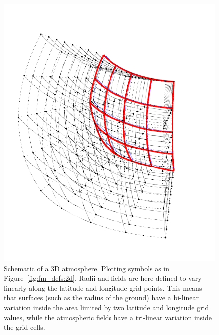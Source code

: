 \begin{figure}[!p]
 \begin{center}
  \includegraphics*[angle=-90,width=0.98\hsize]{Figs/fm_definitions/atm_dim_3d}
  \vspace*{-15mm}
  \caption{Schematic of a 3D atmosphere. Plotting symbols as in 
    Figure~\ref{fig:fm_defs:2d}. Radii and fields are here defined to
    vary linearly along the latitude and longitude grid points. This
    means that surfaces (such as the radius of the ground) have a
    bi-linear variation inside the area limited by two latitude and
    longitude grid values, while the atmospheric fields have a
    tri-linear variation inside the grid cells. }
  \label{fig:fm_defs:3d}
 \end{center}
\end{figure}

